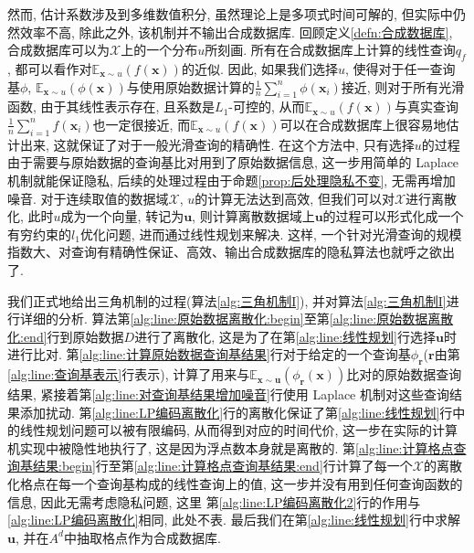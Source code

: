 然而, 估计系数涉及到多维数值积分, 虽然理论上是多项式时间可解的, 但实际中仍然效率不高, 除此之外, 该机制并不输出合成数据库. 回顾定义\ref{defn:合成数据库}, 合成数据库可以为$\mathcal{X}$上的一个分布$u$所刻画. 所有在合成数据库上计算的线性查询$q_f$, 都可以看作对$\mathbb E_{\mathbf{x}\sim u}(f(\mathbf{x}))$的近似. 因此, 如果我们选择$u$, 使得对于任一查询基$\phi$, $\mathbb E_{\mathbf{x}\sim u}(\phi(\mathbf{x}))$与使用原始数据计算的$\frac{1}{n}\sum_{i=1}^n \phi(\mathbf{x}_i)$接近, 则对于所有光滑函数, 由于其线性表示存在, 且系数是$L_1$-可控的, 从而$\mathbb E_{\mathbf{x}\sim u}(f(\mathbf{x}))$与真实查询$\frac{1}{n}\sum_{i=1}^n f(\mathbf{x}_i)$也一定很接近, 而$\mathbb E_{\mathbf{x}\sim u}(f(\mathbf{x}))$可以在合成数据库上很容易地估计出来, 这就保证了对于一般光滑查询的精确性. 在这个方法中, 只有选择$u$的过程由于需要与原始数据的查询基比对用到了原始数据信息, 这一步用简单的 Laplace 机制就能保证隐私, 后续的处理过程由于命题\ref{prop:后处理隐私不变}, 无需再增加噪音. 对于连续取值的数据域$\mathcal{X}$, $u$的计算无法达到高效, 但我们可以对$\mathcal{X}$进行离散化, 此时$u$成为一个向量, 转记为$\mathbf{u}$, 则计算离散数据域上$\mathbf{u}$的过程可以形式化成一个有穷约束的$l_1$优化问题, 进而通过线性规划来解决. 这样, 一个针对光滑查询的规模指数大、对查询有精确性保证、高效、输出合成数据库的隐私算法也就呼之欲出了. 

我们正式地给出三角机制的过程(算法\ref{alg:三角机制I}), 并对算法\ref{alg:三角机制I}进行详细的分析. 算法第\ref{alg:line:原始数据离散化:begin}至第\ref{alg:line:原始数据离散化:end}行到原始数据$D$进行了离散化, 这是为了在第\ref{alg:line:线性规划}行选择$\mathbf{u}$时进行比对. 第\ref{alg:line:计算原始数据查询基结果}行对于给定的一个查询基$\phi_{\mathbf{r}}$($\mathbf{r}$由第\ref{alg:line:查询基表示}行表示), 计算了用来与$\mathbb E_{\mathbf{x}\sim \mathbf{u}}(\phi_{\mathbf{r}}(\mathbf{x}))$比对的原始数据查询结果, 紧接着第\ref{alg:line:对查询基结果增加噪音}行使用 Laplace 机制对这些查询结果添加扰动. 第\ref{alg:line:LP编码离散化}行的离散化保证了第\ref{alg:line:线性规划}行中的线性规划问题可以被有限编码, 从而得到对应的时间代价, 这一步在实际的计算机实现中被隐性地执行了, 这是因为浮点数本身就是离散的. 第\ref{alg:line:计算格点查询基结果:begin}行至第\ref{alg:line:计算格点查询基结果:end}行计算了每一个$\mathcal{X}$的离散化格点在每一个查询基构成的线性查询上的值, 这一步并没有用到任何查询函数的信息, 因此无需考虑隐私问题, 这里 第\ref{alg:line:LP编码离散化2}行的作用与\ref{alg:line:LP编码离散化}相同, 此处不表. 最后我们在第\ref{alg:line:线性规划}行中求解$\mathbf{u}$, 并在$A^d$中抽取格点作为合成数据库.

